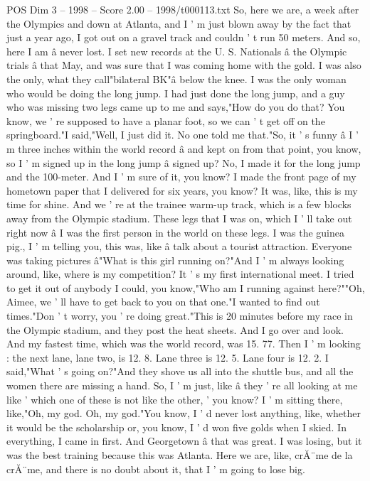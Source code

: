 \begin{textsample}{POS Dim 3 – 1998 – Score 2.00 – 1998/t000113.txt}
So, here we are, a week after the Olympics and down at Atlanta, and I ' m just blown away by the fact that just a year ago, I got out on a gravel track and couldn ' t run 50 meters.
And so, here I am â never lost.
I set new records at the U.
S.
Nationals â the Olympic trials â that May, and was sure that I was coming home with the gold.
I was also the only, what they call"bilateral BK"â below the knee.
I was the only woman who would be doing the long jump.
I had just done the long jump, and a guy who was missing two legs came up to me and says,"How do you do that?
You know, we ' re supposed to have a planar foot, so we can ' t get off on the springboard."I said,"Well, I just did it.
No one told me that."So, it ' s funny â I ' m three inches within the world record â and kept on from that point, you know, so I ' m signed up in the long jump â signed up?
No, I made it for the long jump and the 100-meter.
And I ' m sure of it, you know?
I made the front page of my hometown paper that I delivered for six years, you know?
It was, like, this is my time for shine.
And we ' re at the trainee warm-up track, which is a few blocks away from the Olympic stadium.
These legs that I was on, which I ' ll take out right now â I was the first person in the world on these legs.
I was the guinea pig., I ' m telling you, this was, like â talk about a tourist attraction.
Everyone was taking pictures â"What is this girl running on?"And I ' m always looking around, like, where is my competition?
It ' s my first international meet.
I tried to get it out of anybody I could, you know,"Who am I running against here?""Oh, Aimee, we ' ll have to get back to you on that one."I wanted to find out times."Don ' t worry, you ' re doing great."This is 20 minutes before my race in the Olympic stadium, and they post the heat sheets.
And I go over and look.
And my fastest time, which was the world record, was 15. 77.
Then I ' m looking : the next lane, lane two, is 12. 8.
Lane three is 12. 5.
Lane four is 12. 2.
I said,"What ' s going on?"And they shove us all into the shuttle bus, and all the women there are missing a hand.
So, I ' m just, like â they ' re all looking at me like ' which one of these is not like the other, ' you know?
I ' m sitting there, like,"Oh, my god.
Oh, my god."You know, I ' d never lost anything, like, whether it would be the scholarship or, you know, I ' d won five golds when I skied.
In everything, I came in first.
And Georgetown â that was great.
I was losing, but it was the best training because this was Atlanta.
Here we are, like, crĂ¨me de la crĂ¨me, and there is no doubt about it, that I ' m going to lose big.

\end{textsample}
